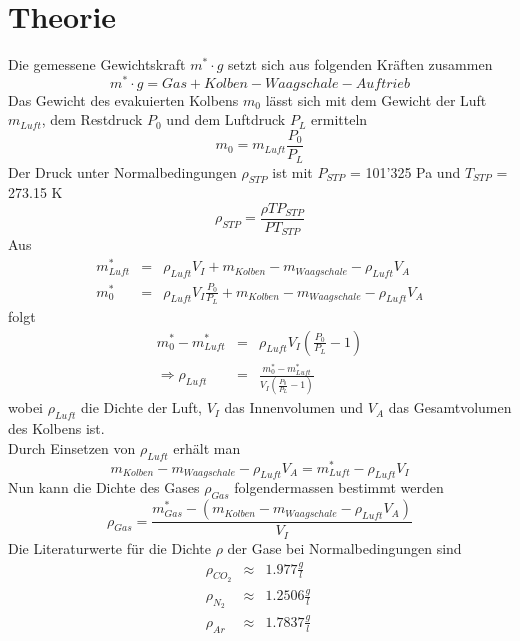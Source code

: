 \documentclass[12pt,a4paper]{article}
\begin{document}
\section*{Theorie}
Die gemessene Gewichtskraft $m^* \cdot g$ setzt sich aus folgenden Kr\"aften zusammen 
\begin{equation}
m^* \cdot g = Gas + Kolben - Waagschale - Auftrieb
\end{equation}
Das Gewicht des evakuierten Kolbens $m_0$ l\"asst sich mit dem Gewicht der Luft $m_{Luft}$, dem Restdruck $P_0$ und dem Luftdruck $P_L$ ermitteln
\begin{equation}
m_0 = m_{Luft} \frac{P_0}{P_L}
\end{equation}
Der Druck unter Normalbedingungen $\rho_{STP}$ ist mit $P_{STP}$ = 101'325 Pa und $T_{STP}$ = 273.15 K
\begin{equation}\label{eq:stp}
\rho_{STP} = \frac{\rho T P_{STP}}{P T_{STP}}
\end{equation}
Aus
\begin{eqnarray}
m^*_{Luft} & = & \rho _{Luft} V_I + m_{Kolben} - m_{Waagschale} - \rho_{Luft} V_A \label{eq:rl} \\
m^*_0 & = & \rho_{Luft} V_I \frac{P_0}{P_L} + m_{Kolben} - m_{Waagschale} - \rho_{Luft} V_A 
\end{eqnarray}
folgt
\begin{eqnarray}
m^*_0 - m^*_{Luft} & = & \rho_{Luft}V_I \left( \frac{P_0}{P_L}-1\right) \\
\Rightarrow \rho_{Luft} & = & \frac{m^*_0 - m^*_{Luft}}{V_I \left( \frac{P_0}{P_L}-1\right)} 
\end{eqnarray}
wobei $\rho_{Luft}$ die Dichte der Luft, $V_I$ das Innenvolumen und $V_A$ das Gesamtvolumen des Kolbens ist. \\
Durch Einsetzen von $\rho_{Luft}$ erh\"alt man
\begin{equation}\label{eq:const}
m_{Kolben} - m_{Waagschale} - \rho_{Luft} V_A = m^*_{Luft} - \rho _{Luft} V_I
\end{equation}
Nun kann die Dichte des Gases $\rho_{Gas}$ folgendermassen bestimmt werden
\begin{equation}\label{eq:rg}
\rho _{Gas} = \frac{m^*_{Gas} - (m_{Kolben} - m_{Waagschale} - \rho_{Luft} V_A)}{V_I}
\end{equation}
Die Literaturwerte f\"ur die Dichte $\rho$ der Gase bei Normalbedingungen sind
\begin{eqnarray}
\rho_{CO_2} & \approx & 1.977 \frac{g}{l}\\
\rho_{N_2} & \approx & 1.2506  \frac{g}{l}\\
\rho_{Ar} & \approx & 1.7837  \frac{g}{l}\
\end{eqnarray}
\end{document}
